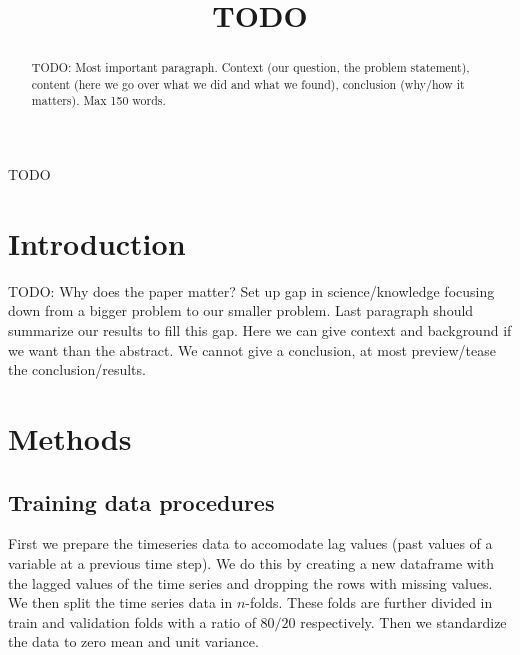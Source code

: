 \documentclass[conference]{IEEEtran}
\begin{document}
\title{TODO}

\author{
\and
{}
\and
{}
\and
{}
}

\maketitle

\begin{abstract}
TODO: Most important paragraph. Context (our question, the problem statement), content (here we go 
over what we did and what we found), conclusion (why/how it matters). Max 150 words.
\end{abstract}

\begin{IEEEkeywords}
TODO
\end{IEEEkeywords}

\section{Introduction}
TODO: Why does the paper matter? Set up gap in science/knowledge focusing down from a bigger 
problem to our smaller problem. Last paragraph should summarize our results to fill this gap. Here 
we can give context and background if we want than the abstract. We cannot give a conclusion, at 
most preview/tease the conclusion/results.


\section{Methods}
\subsection{Training data procedures}
First we prepare the timeseries data to accomodate lag values (past values of a variable at a
previous time step). We do this by creating a new dataframe with the lagged values of the time series 
and dropping the rows with missing values. We then split the time series data in $n$-folds. These folds 
are further divided in train and validation folds with a ratio of $80/20$ respectively. Then we standardize 
the data to zero mean and unit variance.
\end{document}

